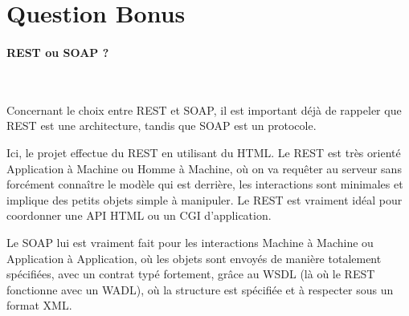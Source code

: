 \documentclass{article}
\begin{document}
\newpage
\section{Question Bonus}
  \paragraph{REST ou SOAP ?}\
  
  Concernant le choix entre REST et SOAP, il est important déjà de rappeler que REST est une architecture, tandis que SOAP est un protocole. \
  
  Ici, le projet effectue du REST en utilisant du HTML. Le REST est très orienté Application à Machine ou Homme à Machine, où on va requêter au
  serveur sans forcément connaître le modèle qui est derrière, les interactions sont minimales et implique des petits objets simple à manipuler.
  Le REST est vraiment idéal pour coordonner une API HTML ou un CGI d'application.\
  
  Le SOAP lui est vraiment fait pour les interactions Machine à Machine ou Application à Application, où les objets sont envoyés de manière totalement spécifiées,
  avec un contrat typé fortement, grâce au WSDL (là où le REST fonctionne avec un WADL), où la structure est spécifiée et à respecter sous un format XML.
  
\end{document}

